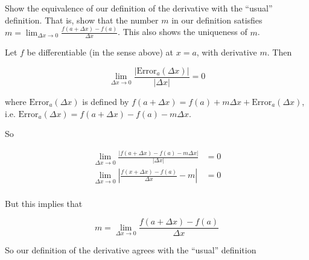\documentclass{ximera}
\begin{document}
Show the equivalence of our definition of the derivative with the ``usual'' definition.  That is, show that the number $m$ in our definition satisfies
$m = \lim_{\Delta x \to 0}\frac{f(a+\Delta x)-f(a)}{\Delta x}$.  This also shows the uniqueness of $m$.

\begin{free-response}
  Let $f$ be differentiable (in the sense above) at $x=a$, with derivative $m$.  Then 
  
  \[ \lim_{\Delta x \to 0} \frac{\left|\text{Error}_a(\Delta x)\right|}{\left|\Delta x\right|} = 0 \]
  
  where $\text{Error}_a(\Delta x)$ is defined by $f(a+\Delta x) = f(a) + m\Delta x + \text{Error}_a(\Delta x)$, i.e. $\text{Error}_a(\Delta x) = f(a+\Delta x) - f(a) -m\Delta x$.
  
  So 
  
  \begin{align*}
    \lim_{\Delta x \to 0} \frac{\left|f(a+\Delta x) - f(a) -m\Delta x\right|}{\left|\Delta x\right|} &= 0\\
    \lim_{\Delta x \to 0} \left| \frac{f(x+\Delta x) -f(a)}{\Delta x} - m\right| &= 0\\
  \end{align*}
  
  But this implies that
  
  \[m = \lim_{\Delta x \to 0}\frac{f(a+\Delta x)-f(a)}{\Delta x}\]
  
  So our definition of the derivative agrees with the  ``usual'' definition
  
\end{free-response}
\end{document}
